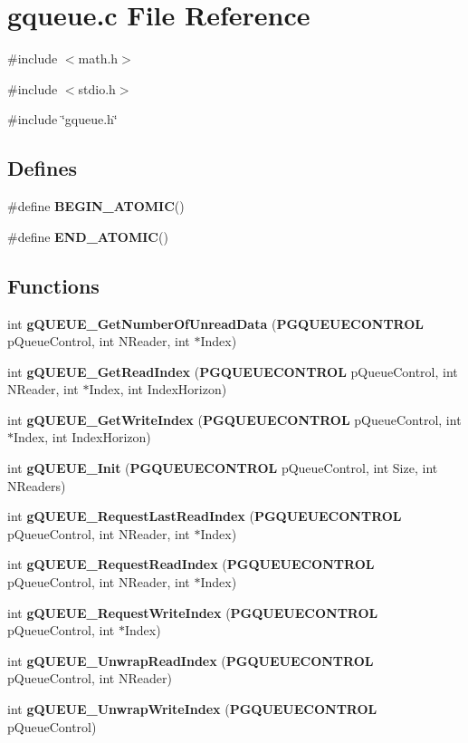 \section{gqueue.c File Reference}
\label{gqueue_8c}
{\ttfamily \#include $<$math.h$>$}\par
{\ttfamily \#include $<$stdio.h$>$}\par
{\ttfamily \#include \char`\"{}gqueue.h\char`\"{}}\par
\subsection*{Defines}
\begin{DoxyCompactItemize}
\item 
\#define {\bf BEGIN\_\-ATOMIC}()
\item 
\#define {\bf END\_\-ATOMIC}()
\end{DoxyCompactItemize}
\subsection*{Functions}
\begin{DoxyCompactItemize}
\item 
int {\bf gQUEUE\_\-GetNumberOfUnreadData} ({\bf PGQUEUECONTROL} pQueueControl, int NReader, int $\ast$Index)
\item 
int {\bf gQUEUE\_\-GetReadIndex} ({\bf PGQUEUECONTROL} pQueueControl, int NReader, int $\ast$Index, int IndexHorizon)
\item 
int {\bf gQUEUE\_\-GetWriteIndex} ({\bf PGQUEUECONTROL} pQueueControl, int $\ast$Index, int IndexHorizon)
\item 
int {\bf gQUEUE\_\-Init} ({\bf PGQUEUECONTROL} pQueueControl, int Size, int NReaders)
\item 
int {\bf gQUEUE\_\-RequestLastReadIndex} ({\bf PGQUEUECONTROL} pQueueControl, int NReader, int $\ast$Index)
\item 
int {\bf gQUEUE\_\-RequestReadIndex} ({\bf PGQUEUECONTROL} pQueueControl, int NReader, int $\ast$Index)
\item 
int {\bf gQUEUE\_\-RequestWriteIndex} ({\bf PGQUEUECONTROL} pQueueControl, int $\ast$Index)
\item 
int {\bf gQUEUE\_\-UnwrapReadIndex} ({\bf PGQUEUECONTROL} pQueueControl, int NReader)
\item 
int {\bf gQUEUE\_\-UnwrapWriteIndex} ({\bf PGQUEUECONTROL} pQueueControl)
\end{DoxyCompactItemize}


